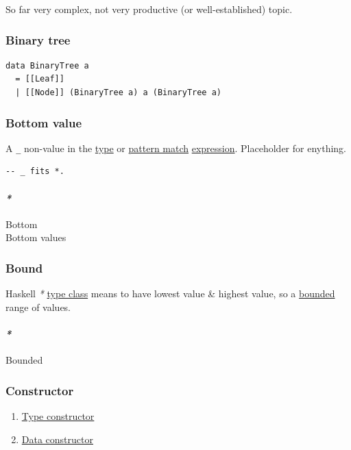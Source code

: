 \documentclass[11pt]{article}
\begin{document}
So far very complex, not very productive (or well-established) topic.\\

\subsubsection{\label{org74a936b}Binary tree}
\label{sec:org6950592}
\begin{verbatim}
data BinaryTree a
  = [[Leaf]]
  | [[Node]] (BinaryTree a) a (BinaryTree a)
\end{verbatim}

\subsubsection{\label{orgaf16aaa}Bottom value}
\label{sec:org1f5b172}
A \texttt{\_} non-value in the \hyperref[org4fbaeb8]{type} or \hyperref[org6cd4afa]{pattern match} \hyperref[org667db83]{expression}. Placeholder for enything.\\

\begin{verbatim}
-- _ fits *.
\end{verbatim}

\paragraph{\emph{*}}
\label{sec:orgf261219}

\label{orgf740641}Bottom\\
\label{org8c4647d}Bottom values\\

\subsubsection{\label{org7d65bda}Bound}
\label{sec:orgc127932}
Haskell \emph{*} \hyperref[orga4a5066]{type class} means to have lowest value \& highest value, so a \hyperref[org806711a]{bounded} range of values.\\

\paragraph{\emph{*}}
\label{sec:org51c5638}

\label{org806711a}Bounded\\

\subsubsection{\label{orgd019743}Constructor}
\label{sec:org58e66e6}
\begin{enumerate}
\item \hyperref[org7285f45]{Type constructor}\\
\item \hyperref[org6dad980]{Data constructor}\\
\end{enumerate}
\end{document}
